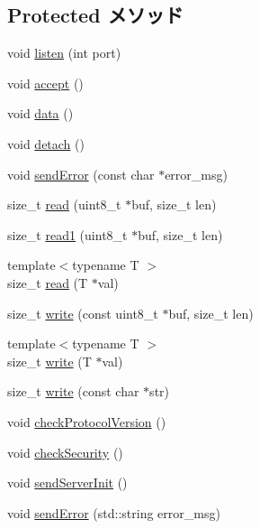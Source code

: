 \subsection*{Protected メソッド}
\begin{DoxyCompactItemize}
\item 
void \hyperlink{classVncServer_ac0c44c1417536740ffc2cf33117027cf}{listen} (int port)
\item 
void \hyperlink{classVncServer_aadb9f3b844fb4cf98288cd3c60a3af91}{accept} ()
\item 
void \hyperlink{classVncServer_a6617ba3e856d8b24979a2a44e5417172}{data} ()
\item 
void \hyperlink{classVncServer_ac295bade8aee589f6718dfa79edc2a34}{detach} ()
\item 
void \hyperlink{classVncServer_a3531045d065c2aa1aaf5a225e2337e80}{sendError} (const char $\ast$error\_\-msg)
\item 
size\_\-t \hyperlink{classVncServer_a9f8a094b410fa145da19663f83f241e3}{read} (uint8\_\-t $\ast$buf, size\_\-t len)
\item 
size\_\-t \hyperlink{classVncServer_ab265cdc9659b04aafe0b93e866024a6d}{read1} (uint8\_\-t $\ast$buf, size\_\-t len)
\item 
{\footnotesize template$<$typename T $>$ }\\size\_\-t \hyperlink{classVncServer_a09f96768306b6f498cf39d32962a853d}{read} (T $\ast$val)
\item 
size\_\-t \hyperlink{classVncServer_a215d71301eb6ae0ebffc5d2f8fe4a140}{write} (const uint8\_\-t $\ast$buf, size\_\-t len)
\item 
{\footnotesize template$<$typename T $>$ }\\size\_\-t \hyperlink{classVncServer_aefa1c03e3a1158303080d2702de2a11e}{write} (T $\ast$val)
\item 
size\_\-t \hyperlink{classVncServer_add50e5436017b9c2f1e0d11c9476bf1b}{write} (const char $\ast$str)
\item 
void \hyperlink{classVncServer_aee7430db7799cf4e0bac388671be878d}{checkProtocolVersion} ()
\item 
void \hyperlink{classVncServer_ad4122a39071b5fd462e19418a432ed31}{checkSecurity} ()
\item 
void \hyperlink{classVncServer_a0d7d773b4b3948da49ae2ecd00f985d5}{sendServerInit} ()
\item 
void \hyperlink{classVncServer_a6ad4e22608f77193eb9cddb1c8b20703}{sendError} (std::string error\_\-msg)
\item 

\end{DoxyCompactItemize}
